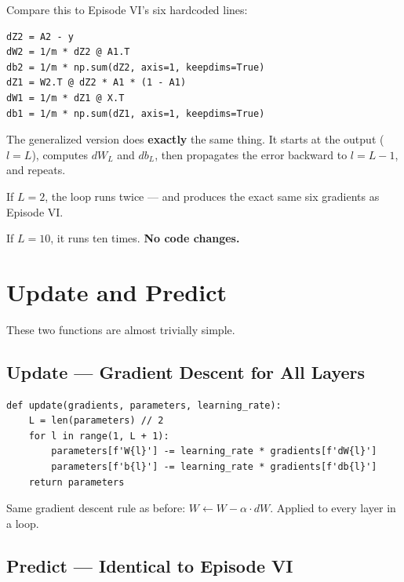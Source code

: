\documentclass[11pt]{article}
\begin{document}
Compare this to Episode VI's six hardcoded lines:

\begin{lstlisting}[title={\small Episode VI --- Hardcoded for 2 layers}]
dZ2 = A2 - y
dW2 = 1/m * dZ2 @ A1.T
db2 = 1/m * np.sum(dZ2, axis=1, keepdims=True)
dZ1 = W2.T @ dZ2 * A1 * (1 - A1)
dW1 = 1/m * dZ1 @ X.T
db1 = 1/m * np.sum(dZ1, axis=1, keepdims=True)
\end{lstlisting}

\begin{warnbox}[title=Same Math --- Just a Loop]
The generalized version does \textbf{exactly} the same thing. It starts at the output ($l = L$), computes $dW_L$ and $db_L$, then propagates the error backward to $l = L-1$, and repeats.

If $L = 2$, the loop runs twice --- and produces the exact same six gradients as Episode VI.

If $L = 10$, it runs ten times. \textbf{No code changes.}
\end{warnbox}


\section{Update and Predict}

These two functions are almost trivially simple.

\subsection{Update --- Gradient Descent for All Layers}

\begin{lstlisting}
def update(gradients, parameters, learning_rate):
    L = len(parameters) // 2
    for l in range(1, L + 1):
        parameters[f'W{l}'] -= learning_rate * gradients[f'dW{l}']
        parameters[f'b{l}'] -= learning_rate * gradients[f'db{l}']
    return parameters
\end{lstlisting}

Same gradient descent rule as before: $W \leftarrow W - \alpha \cdot dW$. Applied to every layer in a loop.

\subsection{Predict --- Identical to Episode VI}
\end{document}
